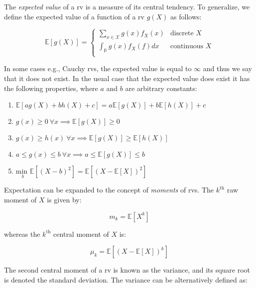 \documentclass{report}
\begin{document}
The \textit{expected value} of a \gls{rv} is a measure of its central tendency. To generalize, we define the expected value of a function of a \gls{rv} $g(X)$ as follows:

\begin{equation}\label{eq:expected-value}
    \mathbb{E}[g(X)] = \begin{cases}
        \sum_{x \in \mathcal{X}} g(x) f_X(x) & \text{discrete } X \\
        \int_{\mathbb{R}} g(x) f_X(f) dx & \text{continuous } X \\
    \end{cases}
\end{equation}

In some cases e.g., Cauchy \glspl{rv}, the expected value is equal to $\infty$ and thus we say that it does not exist. In the usual case that the expected value does exist it has the following properties, where $a$ and $b$ are arbitrary constants:

\begin{enumerate}
    \item $\mathbb{E}[ag(X) + bh(X) + c] = a\mathbb{E}[g(X)] + b\mathbb{E}[h(X)] + c$
    \item $g(x) \geq 0 \: \forall x \implies \mathbb{E}[g(X)] \geq 0$ 
    \item $g(x) \geq h(x) \: \forall x \implies \mathbb{E}[g(X)] \geq \mathbb{E}[h(X)]$
    \item $a \leq g(x) \leq b \: \forall x \implies a \leq \mathbb{E}[g(X)] \leq b$
    \item $\underset{b}{\text{min }} \mathbb{E}\left[(X - b)^2\right] = \mathbb{E}\left[(X - \mathbb{E}[X])^2\right]$
\end{enumerate}

Expectation can be expanded to the concept of \textit{moments} of \glspl{rv}. The $k^{\text{th}}$ raw moment of $X$ is given by:

\begin{equation}\label{eq:raw-moment}
    m_k = \mathbb{E}\left[X^k\right]
\end{equation}

whereas the $k^{\text{th}}$ central moment of $X$ is:

\begin{equation}\label{eq:central-moment}
    \mu_k = \mathbb{E}\left[(X - \mathbb{E}[X])^k\right]
\end{equation}

The second central moment of a \gls{rv} is known as the variance, and its square root is denoted the standard deviation. The variance can be alternatively defined as:
\end{document}
